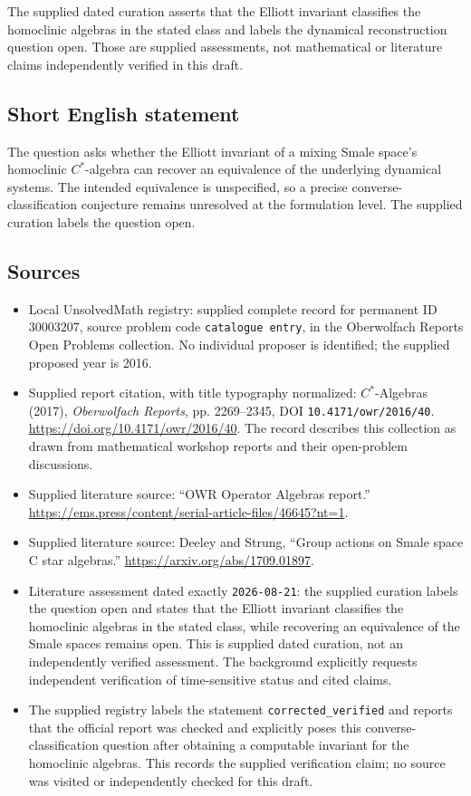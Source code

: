 \documentclass[11pt]{article}
\begin{document}
The supplied dated curation asserts that the Elliott invariant classifies the homoclinic algebras in the stated class and labels the dynamical reconstruction question open. Those are supplied assessments, not mathematical or literature claims independently verified in this draft.
\subsection{Short English statement}
The question asks whether the Elliott invariant of a mixing Smale space's homoclinic \(C^*\)-algebra can recover an equivalence of the underlying dynamical systems. The intended equivalence is unspecified, so a precise converse-classification conjecture remains unresolved at the formulation level. The supplied curation labels the question open.
\subsection{Sources}
\begin{itemize}
\item Local UnsolvedMath registry: supplied complete record for permanent ID \(30003207\), source problem code \texttt{catalogue entry}, in the Oberwolfach Reports Open Problems collection. No individual proposer is identified; the supplied proposed year is 2016.
\item Supplied report citation, with title typography normalized: \(C^*\)-Algebras (2017), \emph{Oberwolfach Reports}, pp. 2269--2345, DOI \texttt{10.4171/owr/2016/40}. \url{https://doi.org/10.4171/owr/2016/40}. The record describes this collection as drawn from mathematical workshop reports and their open-problem discussions.
\item Supplied literature source: ``OWR Operator Algebras report.'' \url{https://ems.press/content/serial-article-files/46645?nt=1}.
\item Supplied literature source: Deeley and Strung, ``Group actions on Smale space C star algebras.'' \url{https://arxiv.org/abs/1709.01897}.
\item Literature assessment dated exactly \texttt{2026-08-21}: the supplied curation labels the question open and states that the Elliott invariant classifies the homoclinic algebras in the stated class, while recovering an equivalence of the Smale spaces remains open. This is supplied dated curation, not an independently verified assessment. The background explicitly requests independent verification of time-sensitive status and cited claims.
\item The supplied registry labels the statement \texttt{corrected\_verified} and reports that the official report was checked and explicitly poses this converse-classification question after obtaining a computable invariant for the homoclinic algebras. This records the supplied verification claim; no source was visited or independently checked for this draft.
\end{itemize}
\end{document}
